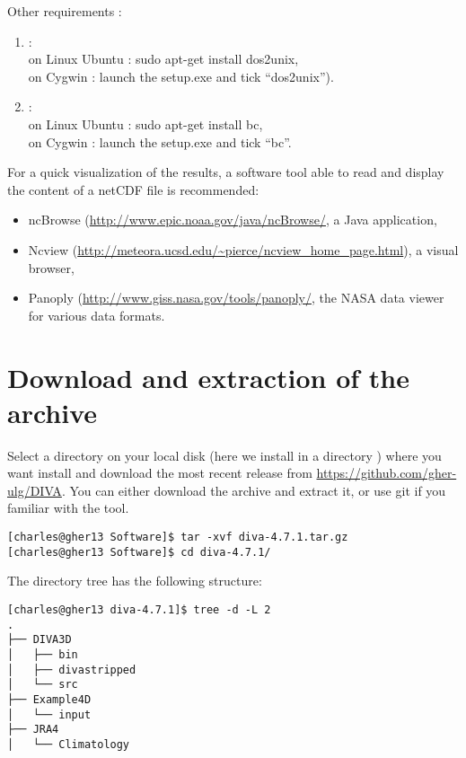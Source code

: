 Other requirements :
\begin{enumerate}
 \item {}:\\
 on Linux Ubuntu : sudo apt-get install dos2unix, \\
 on Cygwin : launch the setup.exe and tick ``dos2unix'').
 \item {}:\\
 on Linux Ubuntu : sudo apt-get install bc,\\
  on Cygwin : launch the setup.exe and tick ``bc''.
\end{enumerate}



For a quick visualization of the results, a software tool able to read and display the content of a netCDF  file is recommended:
\begin{itemize}
\item ncBrowse (\url{http://www.epic.noaa.gov/java/ncBrowse/}, a Java application,
\item Ncview (\url{http://meteora.ucsd.edu/~pierce/ncview_home_page.html}), a visual browser, 
\item Panoply (\url{http://www.giss.nasa.gov/tools/panoply/}, the NASA data viewer for various data formats.
\end{itemize}


\section{Download and extraction of the archive}
Select a directory on your local disk (here we install in a directory ) where you want install \diva and download the most recent release from \url{https://github.com/gher-ulg/DIVA}. You can either download the archive and extract it, or use git if you familiar with the tool.


\begin{lstlisting}[style=Bash]
[charles@gher13 Software]$ tar -xvf diva-4.7.1.tar.gz
[charles@gher13 Software]$ cd diva-4.7.1/
\end{lstlisting}

The directory tree has the following structure: %
\begin{lstlisting}[style=Bash]
[charles@gher13 diva-4.7.1]$ tree -d -L 2
.
├── DIVA3D
│   ├── bin
│   ├── divastripped
│   └── src
├── Example4D
│   └── input
├── JRA4
│   └── Climatology
\end{lstlisting}


